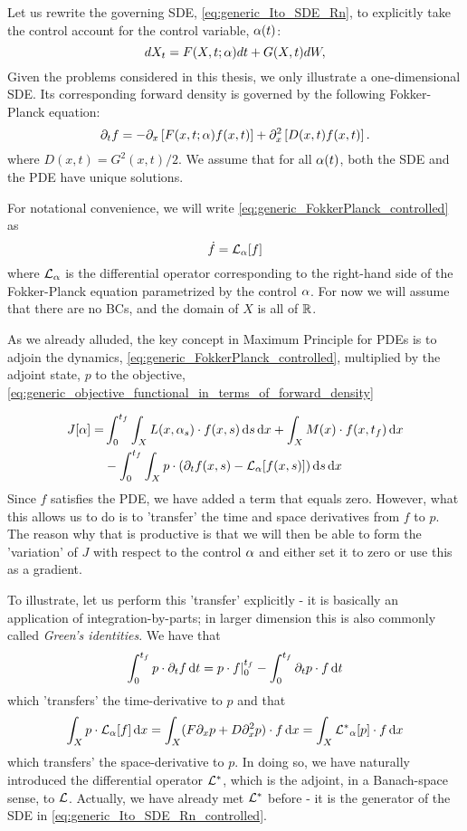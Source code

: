 Let us rewrite the governing SDE, \cref{eq:generic_Ito_SDE_Rn}, to explicitly
take the control  account for the control variable, $\alpha(t)$:
\begin{equation}
dX_t = F(X,t; \alpha) dt + G(X,t) dW,
\label{eq:generic_Ito_SDE_Rn_controlled}
\end{equation} 
Given the problems considered in this thesis, we only
illustrate  a one-dimensional SDE. Its corresponding forward density is
governed by the following Fokker-Planck equation: 
\begin{equation}
{\partial}_t {f}= -{\partial}_{x } \left[ F (x,t;\alpha) {f}(x,t) \right] +  
{\partial}^2_{x} \left[ D(x,t) {f}(x,t) \right]
\label{eq:generic_FokkerPlanck_controlled}.
\end{equation} 
where $D(x,t) = G^2(x,t)/2$. We assume that for all $\alpha(t)$, both the SDE and the
PDE have unique solutions. 

For notational convenience, we will write
\cref{eq:generic_FokkerPlanck_controlled} as
$$ \dot{{f}} = { \mathcal{L} }_{\alpha} [{f}] $$ where ${ \mathcal{L} }_{\alpha}$ is the differential operator corresponding to the
right-hand side of the Fokker-Planck equation parametrized by the control $\alpha$.
For now we will assume that there are no BCs, and the domain of $X$ is all of ${ \mathbb{R} }$.

As we already alluded, the key concept in Maximum Principle for PDEs is to
adjoin the dynamics, \cref{eq:generic_FokkerPlanck_controlled}, multiplied by
the adjoint state, $p$ to the objective,
\cref{eq:generic_objective_functional_in_terms_of_forward_density}
  
\begin{align*}
J[\alpha] =& \int_0^{ t_f }\int_X L(x, \alpha_s) \cdot f(x,s) \, \mathrm{d} s\, \mathrm{d} x 
+ \int_X  M(x)\cdot f(x,{ t_f }) \, \mathrm{d} x
\\ &- \int_0^{ t_f }\int_X p \cdot ({\partial}_t f(x,s)  - { \mathcal{L} }_{\alpha} [f(x,s)] )
\, \mathrm{d} s\, \mathrm{d} x
\end{align*}
Since $f$ satisfies the PDE, we have added a term that equals zero. 
However, what this allows us to do is to 'transfer' the time and space
derivatives from $f$ to $p$. The reason why
that is productive is that we will then be able to form the 'variation'
of $J$ with respect to the control $\alpha$ and either set it to zero or use this as
a gradient. 

To illustrate, let us perform this 'transfer' explicitly - it is basically an
application of integration-by-parts; in larger dimension this is also commonly
called {\sl Green's identities}.  We have that $$
 \int_0^{ t_f }   p \cdot {\partial}_t f   \, \mathrm{d} t =
  p\cdot f|_0^{ t_f } - \int_0^{ t_f }   {\partial}_t p \cdot   f  \, \mathrm{d} t
$$ which 'transfers' the time-derivative to $p$ and that $$ \int_X  p \cdot 
{ \mathcal{L} }_{\alpha} [f ]  \, \mathrm{d} x = \int_X  ( F  {\partial}_x p + D {\partial}_x^2 p) \cdot  f  \, \mathrm{d} x =
\int_X   { { \mathcal{L} }^* }_{\alpha} [p] \cdot f  \, \mathrm{d} x $$ which transfers' the
space-derivative to $p$. In doing so, we have  naturally introduced 
 the differential operator ${ { \mathcal{L} }^* }$, which is the adjoint, in a Banach-space
 sense, to ${ \mathcal{L} }$. Actually, we have already met ${ { \mathcal{L} }^* }$ before - it is the
 generator of the SDE in \cref{eq:generic_Ito_SDE_Rn_controlled}.

